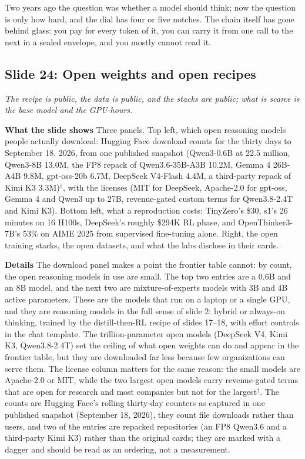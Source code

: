 \documentclass[11pt,letterpaper]{article}
\newcommand{\slide}[3]{%
  \subsection[Slide #1: #2]{Slide #1: #2}%
  {\color{muted}\itshape #3\par}\medskip}
\newcommand{\para}[1]{\medskip\noindent\textbf{#1}\quad}
\newenvironment{intuition}{\begin{tcolorbox}[intuitionbox]}{\end{tcolorbox}}
\begin{document}
\begin{intuition}
Two years ago the question was whether a model should think; now the question is only how hard, and the dial has four or five notches. The chain itself has gone behind glass: you pay for every token of it, you can carry it from one call to the next in a sealed envelope, and you mostly cannot read it.
\end{intuition}

\slide{24}{Open weights and open recipes}{The recipe is public, the data is public, and the stacks are public; what is scarce is the base model and the GPU-hours.}

\para{What the slide shows} Three panels. Top left, which open reasoning models people actually download: Hugging Face download counts for the thirty days to September 18, 2026, from one published snapshot (Qwen3-0.6B at 22.5 million, Qwen3-8B 13.0M, the FP8 repack of Qwen3.6-35B-A3B 10.2M, Gemma 4 26B-A4B 9.8M, gpt-oss-20b 6.7M, DeepSeek V4-Flash 4.4M, a third-party repack of Kimi K3 3.3M)$^\dagger$, with the licenses (MIT for DeepSeek, Apache-2.0 for gpt-oss, Gemma 4 and Qwen3 up to 27B, revenue-gated custom terms for Qwen3.8-2.4T and Kimi K3). Bottom left, what a reproduction costs: TinyZero's \$30, s1's 26 minutes on 16 H100s, DeepSeek's roughly \$294K RL phase, and OpenThinker3-7B's 53\% on AIME 2025 from supervised fine-tuning alone. Right, the open training stacks, the open datasets, and what the labs disclose in their cards.

\para{Details} The download panel makes a point the frontier table cannot: by count, the open reasoning models in use are small. The top two entries are a 0.6B and an 8B model, and the next two are mixture-of-experts models with 3B and 4B active parameters. These are the models that run on a laptop or a single GPU, and they are reasoning models in the full sense of slide 2: hybrid or always-on thinking, trained by the distill-then-RL recipe of slides 17--18, with effort controls in the chat template. The trillion-parameter open models (DeepSeek V4, Kimi K3, Qwen3.8-2.4T) set the ceiling of what open weights can do and appear in the frontier table, but they are downloaded far less because few organizations can serve them. The license column matters for the same reason: the small models are Apache-2.0 or MIT, while the two largest open models carry revenue-gated terms that are open for research and most companies but not for the largest$^\dagger$. The counts are Hugging Face's rolling thirty-day counters as captured in one published snapshot (September 18, 2026), they count file downloads rather than users, and two of the entries are repacked repositories (an FP8 Qwen3.6 and a third-party Kimi K3) rather than the original cards; they are marked with a dagger and should be read as an ordering, not a measurement.
\end{document}
